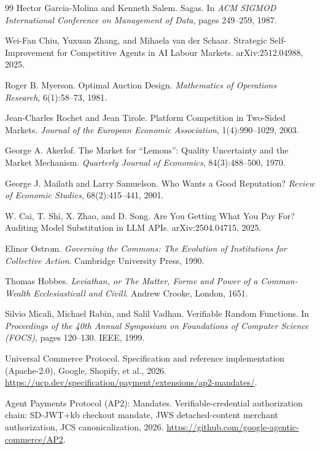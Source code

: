 \documentclass[11pt,a4paper]{article}
\theoremstyle{definition}
\begin{document}
\begin{thebibliography}{99}
Hector Garcia-Molina and Kenneth Salem.
\newblock Sagas.
\newblock In \textit{ACM SIGMOD International Conference on Management of Data}, pages 249--259, 1987.

Wei-Fan Chiu, Yuxuan Zhang, and Mihaela van der Schaar.
\newblock Strategic Self-Improvement for Competitive Agents in AI Labour Markets.
\newblock arXiv:2512.04988, 2025.

Roger B. Myerson.
\newblock Optimal Auction Design.
\newblock \textit{Mathematics of Operations Research}, 6(1):58--73, 1981.

Jean-Charles Rochet and Jean Tirole.
\newblock Platform Competition in Two-Sided Markets.
\newblock \textit{Journal of the European Economic Association}, 1(4):990--1029, 2003.

George A. Akerlof.
\newblock The Market for ``Lemons'': Quality Uncertainty and the Market Mechanism.
\newblock \textit{Quarterly Journal of Economics}, 84(3):488--500, 1970.

George J. Mailath and Larry Samuelson.
\newblock Who Wants a Good Reputation?
\newblock \textit{Review of Economic Studies}, 68(2):415--441, 2001.

W. Cai, T. Shi, X. Zhao, and D. Song.
\newblock Are You Getting What You Pay For? Auditing Model Substitution in LLM APIs.
\newblock arXiv:2504.04715, 2025.

Elinor Ostrom.
\newblock \textit{Governing the Commons: The Evolution of Institutions for Collective Action}.
\newblock Cambridge University Press, 1990.

Thomas Hobbes.
\newblock \textit{Leviathan, or The Matter, Forme and Power of a Common-Wealth Ecclesiasticall and Civill}.
\newblock Andrew Crooke, London, 1651.

Silvio Micali, Michael Rabin, and Salil Vadhan.
\newblock Verifiable Random Functions.
\newblock In \textit{Proceedings of the 40th Annual Symposium on Foundations of Computer Science (FOCS)}, pages 120--130. IEEE, 1999.

Universal Commerce Protocol.
\newblock Specification and reference implementation (Apache-2.0), Google, Shopify, et al., 2026.
\newblock \url{https://ucp.dev/specification/payment/extensions/ap2-mandates/}.

Agent Payments Protocol (AP2): Mandates.
\newblock Verifiable-credential authorization chain: SD-JWT+kb checkout mandate, JWS detached-content merchant authorization, JCS canonicalization, 2026.
\newblock \url{https://github.com/google-agentic-commerce/AP2}.


\end{thebibliography}
\end{document}
